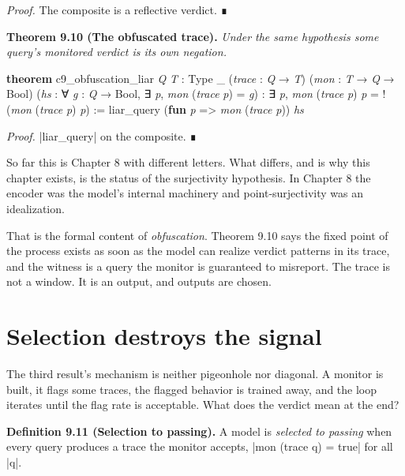 \documentclass{memoir}
\begin{document}
\emph{Proof.} The composite is a reflective verdict. ∎

\textbf{Theorem 9.10 (The obfuscated trace).} \emph{Under the same hypothesis some query's
monitored verdict is its own negation.}

\begin{LeanVerbatim}
\textbf{theorem} c9_obfuscation_liar \textit{Q} \textit{T} : Type _
    (\textit{trace} : \textit{Q} → \textit{T}) (\textit{mon} : \textit{T} → \textit{Q} → Bool)
    (\textit{hs} : ∀ \textit{g} : \textit{Q} → Bool, ∃ \textit{p}, \textit{mon} (\textit{trace} \textit{p}) = \textit{g}) :
    ∃ \textit{p}, \textit{mon} (\textit{trace} \textit{p}) \textit{p} = !(\textit{mon} (\textit{trace} \textit{p}) \textit{p}) :=
  liar_query (\textbf{fun} \textit{p} => \textit{mon} (\textit{trace} \textit{p})) \textit{hs}

\end{LeanVerbatim}


\emph{Proof.} \LeanVerb|liar_query| on the composite. ∎

So far this is Chapter 8 with different letters. What differs, and is why this
chapter exists, is the status of the surjectivity hypothesis. In Chapter 8 the
encoder was the model's internal machinery and point-surjectivity was an
idealization.

That is the formal content of \emph{obfuscation}. Theorem 9.10 says the fixed point
of the process exists as soon as the model can realize verdict patterns in its
trace, and the witness is a query the monitor is guaranteed to misreport. The
trace is not a window. It is an output, and outputs are chosen.



\section{Selection destroys the signal}\label{Two--Schemas--of--Impossibility-005F-005F-005F--Machine--Checked--Limits--of--Trustworthy--Machine--Learning-005F-005F-005F--and--Why--They--Tighten--with--Capability----The--Trace--Is--Not--a--Window----Selection--destroys--the--signal}

The third result's mechanism is neither pigeonhole nor diagonal. A monitor is
built, it flags some traces, the flagged behavior is trained away, and the loop
iterates until the flag rate is acceptable. What does the verdict mean at the
end?

\textbf{Definition 9.11 (Selection to passing).} A model is \emph{selected to passing} when every
query produces a trace the monitor accepts, \LeanVerb|mon (trace q) = true| for all \LeanVerb|q|.
\end{document}
